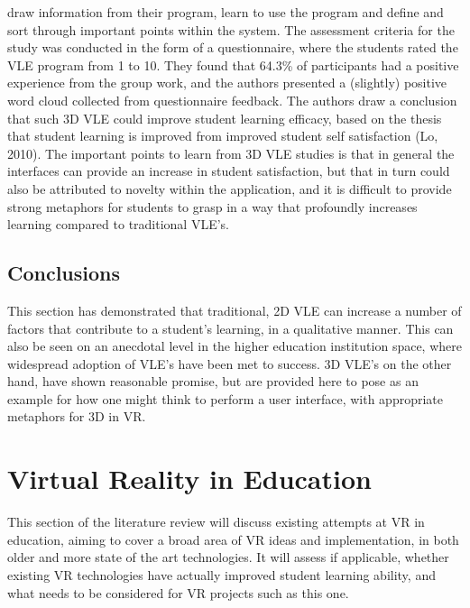 \documentclass[11pt]{report}
\begin{document}
draw information from their program, learn to use the program and define and sort through important points within the system. The assessment criteria for the study was conducted in the form of a questionnaire, where the students rated the VLE program from 1 to 10. They found that 64.3\% of participants had a positive experience from the group work, and the authors presented a (slightly) positive word cloud collected from questionnaire feedback. The authors draw a conclusion that such 3D VLE could improve student learning efficacy, based on the thesis that student learning is improved from improved student self satisfaction (Lo, 2010). The important points to learn from 3D VLE studies is that in general the interfaces can provide an increase in student satisfaction, but that in turn could also be attributed to novelty within the application, and it is difficult to provide strong metaphors for students to grasp in a way that profoundly increases learning compared to traditional VLE's.
\subsection{Conclusions}
This section has demonstrated that traditional, 2D VLE can increase a number of factors that contribute to a student's learning, in a qualitative manner. This can also be seen on an anecdotal level in the higher education institution space, where widespread adoption of VLE's have been met to success. 3D VLE's on the other hand, have shown reasonable promise, but are provided here to pose as an example for how one might think to perform a user interface, with appropriate metaphors for 3D in VR. 
\section{Virtual Reality in Education}
This section of the literature review will discuss existing attempts at VR in education, aiming to cover a broad area of VR ideas and implementation, in both older and more state of the art technologies. It will assess if applicable, whether existing VR technologies have actually improved student learning ability, and what needs to be considered for VR projects such as this one.
\end{document}
